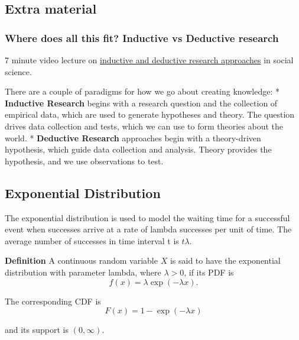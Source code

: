 \documentclass[]{article}
\begin{document}
\hypertarget{extra-material}{%
\subsection{Extra material}\label{extra-material}}

\hypertarget{where-does-all-this-fit-inductive-vs-deductive-research}{%
\subsubsection{Where does all this fit? Inductive vs Deductive
research}\label{where-does-all-this-fit-inductive-vs-deductive-research}}

7 minute video lecture on \href{https://youtu.be/QB41z6_mUxk}{inductive
and deductive research approaches} in social science.

There are a couple of paradigms for how we go about creating knowledge:
* \textbf{Inductive Research} begins with a research question and the
collection of empirical data, which are used to generate hypotheses and
theory. The question drives data collection and tests, which we can use
to form theories about the world. * \textbf{Deductive Research}
approaches begin with a theory-driven hypothesis, which guide data
collection and analysis. Theory provides the hypothesis, and we use
observations to test.

\subsection{Exponential Distribution}
The exponential distribution is used to model the waiting time for a
successful event when successes arrive at a rate of lambda successes per
unit of time. The average number of successes in time interval t is
$t\lambda$.

\textbf{Definition} A continuous random variable $X$ is said to have the exponential distribution with parameter lambda, where $\lambda > 0$, if its PDF is
\begin{equation}
f(x) = \lambda \exp(-\lambda x).
\end{equation}

The corresponding CDF is
\begin{equation}
F(x) = 1 - \exp(-\lambda x)
\end{equation}

and its support is $(0,\infty)$.
\end{document}
